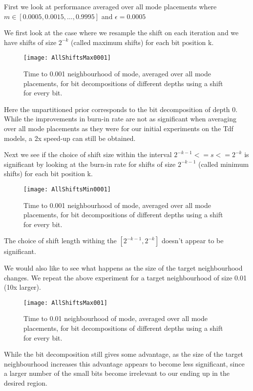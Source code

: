 First we look at performance averaged over all mode placements where $m \in [0.0005, 0.0015,…, 0.9995]$ and $\epsilon = 0.0005$

We first look at the case where we resample the shift on each iteration and we have shifts of size $2^{-k}$ (called maximum shifts) for each bit position k.

\begin{figure}[H]
    \centering
    \texttt{[image: AllShiftsMax0001]}
    \caption{Time to 0.001 neighbourhood of mode, averaged over all mode placements, for bit decompositions of different depths using a shift for every bit.}
    \label{fig:AllShiftsMax0001}
\end{figure}

Here the unpartitioned prior corresponds to the bit decomposition of depth 0. While the improvements in burn-in rate are not as significant when averaging over all mode placements as they were for our initial experiments on the Tdf models, a 2x speed-up can still be obtained.

Next we see if the choice of shift size within the interval $2^{-k-1} <= s <= 2^{-k}$ is significant by looking at the burn-in rate for shifts of size $2^{-k-1}$ (called minimum shifts) for each bit position k.

\begin{figure}[H]
    \centering
    \texttt{[image: AllShiftsMin0001]}
    \caption{Time to 0.001 neighbourhood of mode, averaged over all mode placements, for bit decompositions of different depths using a shift for every bit.}
    \label{fig:AllShiftsMin0001}
\end{figure}

The choice of shift length withing the $[2^{-k-1}, 2^{-k}]$ doesn't appear to be significant.

We would also like to see what happens as the size of the target neighbourhood changes. We repeat the above experiment for a target neighbourhood of size 0.01 (10x larger).

\begin{figure}[H]
    \centering
    \texttt{[image: AllShiftsMax001]}
    \caption{Time to 0.01 neighbourhood of mode, averaged over all mode placements, for bit decompositions of different depths using a shift for every bit.}
    \label{fig:AllShiftsMax001}
\end{figure}

While the bit decomposition still gives some advantage, as the size of the target neighbourhood increases this advantage appears to become less significant, since a larger number of the small bits become irrelevant to our ending up in the desired region.

